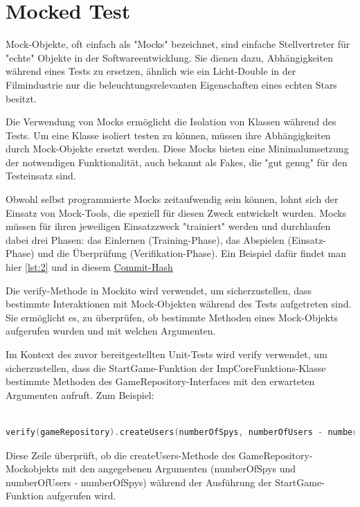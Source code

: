 \section{Mocked Test}
Mock-Objekte, oft einfach als "Mocks" bezeichnet, sind einfache Stellvertreter für "echte" Objekte in der Softwareentwicklung. Sie dienen dazu, Abhängigkeiten während eines Tests zu ersetzen, ähnlich wie ein Licht-Double in der Filmindustrie nur die beleuchtungsrelevanten Eigenschaften eines echten Stars besitzt.

Die Verwendung von Mocks ermöglicht die Isolation von Klassen während des Tests. Um eine Klasse isoliert testen zu können, müssen ihre Abhängigkeiten durch Mock-Objekte ersetzt werden. Diese Mocks bieten eine Minimalumsetzung der notwendigen Funktionalität, auch bekannt als Fakes, die "gut genug" für den Testeinsatz sind.

Obwohl selbst programmierte Mocks zeitaufwendig sein können, lohnt sich der Einsatz von Mock-Tools, die speziell für diesen Zweck entwickelt wurden. Mocks müssen für ihren jeweiligen Einsatzzweck "trainiert" werden und durchlaufen dabei drei Phasen: das Einlernen (Training-Phase), das Abspielen (Einsatz-Phase) und die Überprüfung (Verifikation-Phase). Ein Beispiel dafür findet man hier \ref{lst:2} und in diesem \href{https://github.com/lorenz1702/Spy-Game/commit/b0692bf0d1c65c3f4af85381358f92dc94f1eeca}{Commit-Hash}

Die verify-Methode in Mockito wird verwendet, um sicherzustellen, dass bestimmte Interaktionen mit Mock-Objekten während des Tests aufgetreten sind. Sie ermöglicht es, zu überprüfen, ob bestimmte Methoden eines Mock-Objekts aufgerufen wurden und mit welchen Argumenten.

Im Kontext des zuvor bereitgestellten Unit-Tests wird verify verwendet, um sicherzustellen, dass die StartGame-Funktion der ImpCoreFunktions-Klasse bestimmte Methoden des GameRepository-Interfaces mit den erwarteten Argumenten aufruft. Zum Beispiel:

\begin{lstlisting}[language=Kotlin, label={lst:5}]

verify(gameRepository).createUsers(numberOfSpys, numberOfUsers - numberOfSpys)
\end{lstlisting}
Diese Zeile überprüft, ob die createUsers-Methode des GameRepository-Mockobjekts mit den angegebenen Argumenten (numberOfSpys und numberOfUsers - numberOfSpys) während der Ausführung der StartGame-Funktion aufgerufen wird.

